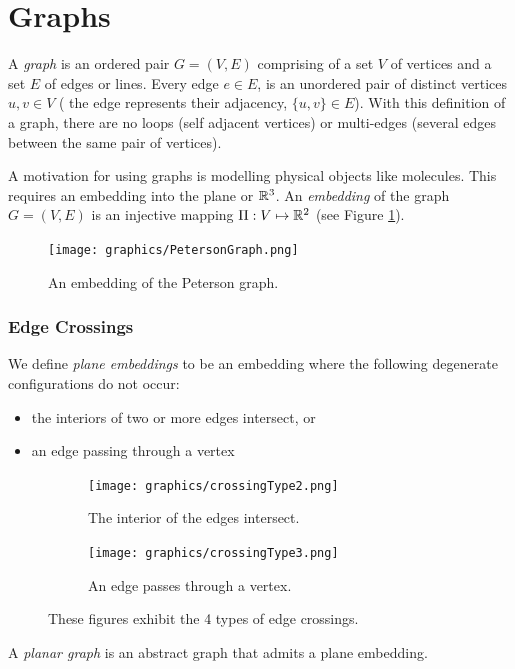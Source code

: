 \section{Graphs}
A \textit{graph} is an 
ordered pair $G = (V,E)$ comprising of a set $V$ of vertices and a set $E$ of edges or 
lines.  Every edge $e \in E$, is an unordered pair of distinct vertices $u,v \in V$ (
the edge represents their adjacency, $\{ u,v\} \in E$). With this definition of a graph, there are 
no loops (self adjacent vertices) or multi-edges (several edges between the same pair of vertices).

A motivation for using graphs is modelling physical objects like molecules.  This requires an 
embedding into the plane or ${\mathbb{R}}^3$.  An \textit{embedding} of the 
graph $G = (V,E)$ is an injective mapping $\Pi : V \mapsto {\mathbb{R}}^{2}$ (see Figure 
\ref{fig:graph1-1}). 

\begin{figure}[!htbp]
\begin{center}
\texttt{[image: graphics/PetersonGraph.png]}
\caption{An embedding of the Peterson graph.}\label{fig:graph1-1}
\end{center} 
\end{figure} 
\subsubsection{Edge Crossings}
We define \textit{plane embeddings} to be an embedding where the following degenerate configurations 
do not occur:
\begin{itemize}
\item[\rn{1}] the interiors of two or more edges intersect, or
\item[\rn{2}] an edge passing through a vertex
\end{itemize} 
\begin{figure}[H]
\begin{center}
  \begin{subfigure}[b]{0.49\textwidth}
	  \texttt{[image: graphics/crossingType2.png]}
	  \caption{The interior of the edges intersect.}
	  \label{fig:ch1-linkages-1-2}
  \end{subfigure}
  \begin{subfigure}[b]{0.49\textwidth}
	  \texttt{[image: graphics/crossingType3.png]}
	  \caption{An edge passes through a vertex.}
	  \label{fig:ch1-linkages-1-3}
  \end{subfigure}
\end{center} 
\caption{These figures exhibit the 4 types of edge crossings.}\label{fig:ch1-linkages-1}
\end{figure}
A \textit{planar graph} is an abstract graph that admits a plane embedding.
